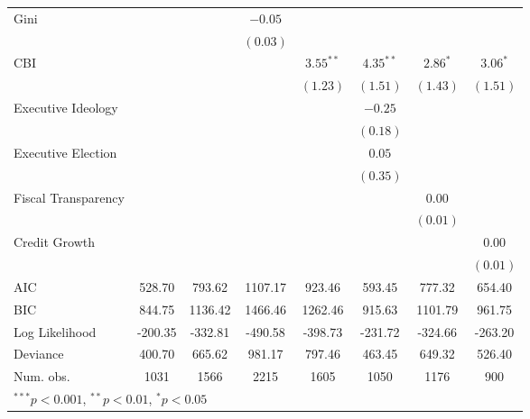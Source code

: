 \begin{tabular}{l c c c c c c c }
Gini                          &               &               & $-0.05$      &               &               &               &               \\
                              &               &               & $(0.03)$     &               &               &               &               \\
CBI                           &               &               &              & $3.55^{**}$   & $4.35^{**}$   & $2.86^{*}$    & $3.06^{*}$    \\
                              &               &               &              & $(1.23)$      & $(1.51)$      & $(1.43)$      & $(1.51)$      \\
Executive Ideology            &               &               &              &               & $-0.25$       &               &               \\
                              &               &               &              &               & $(0.18)$      &               &               \\
Executive Election            &               &               &              &               & $0.05$        &               &               \\
                              &               &               &              &               & $(0.35)$      &               &               \\
Fiscal Transparency           &               &               &              &               &               & $0.00$        &               \\
                              &               &               &              &               &               & $(0.01)$      &               \\
Credit Growth                 &               &               &              &               &               &               & $0.00$        \\
                              &               &               &              &               &               &               & $(0.01)$      \\
\hline
AIC                           & 528.70        & 793.62        & 1107.17      & 923.46        & 593.45        & 777.32        & 654.40        \\
BIC                           & 844.75        & 1136.42       & 1466.46      & 1262.46       & 915.63        & 1101.79       & 961.75        \\
Log Likelihood                & -200.35       & -332.81       & -490.58      & -398.73       & -231.72       & -324.66       & -263.20       \\
Deviance                      & 400.70        & 665.62        & 981.17       & 797.46        & 463.45        & 649.32        & 526.40        \\
Num. obs.                     & 1031          & 1566          & 2215         & 1605          & 1050          & 1176          & 900           \\
\hline
\multicolumn{8}{l}{\scriptsize{$^{***}p<0.001$, $^{**}p<0.01$, $^*p<0.05$}}
\end{tabular}
